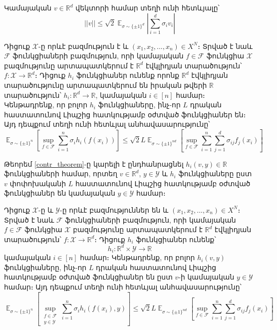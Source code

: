 \documentclass[12pt]{article}
\DeclareMathOperator*{\E}{\mathbb{E}}
\begin{document}
\begin{preposition}
\label{prep_vec_ineq}
Կամայական $v \in \mathbb{R}^d$ վեկտորի համար տեղի ունի հետևյալը՝
$$||v|| \leq \sqrt{2}\E_{\sigma \sim \{\pm1\}^d} \left| \sum_{i=1}^d \sigma_iv_i \right|$$
\end{preposition}
\begin{theorem}
\label{contr_theorem}
Դիցուք $\mathcal{X}$-ը որևէ բազմություն է և $(x_1, x_2, ..., x_n) \in X^N$։ Տրված է նաև $\mathcal{F}$ ֆունկցիաների բազմություն, որի կամայական $f \in \mathcal{F}$ ֆունկցիա $\mathcal{X}$ բազմությունը արտապատկերում է $\mathbb{R}^d$ էվկլիդյան տարածություն՝ $f:\mathcal{X} \rightarrow \mathbb{R}^d$։ Դիցուք $h_i$ ֆունկցիաներ ունենք որոնք $\mathbb{R}^d$ էվկլիդյան տարածությունը արտապատկերում են  իրական թվերի $\mathbb{R}$ տարածություն՝
$h_i:\mathbb{R}^d \rightarrow \mathbb{R}$, կամայական $i \in [n]$ համար։ Կենթադրենք, որ բոլոր $h_i$ ֆունկցիաները, ինչ-որ $L$ դրական հաստատունով Լիպշից հատկությամբ օժտված ֆունկցիաներ են։ Այդ դեպքում տեղի ունի հետևյալ անհավասարությունը՝
\begin{equation}
\label{contradiction_ineq}
\E_{\sigma \sim \{\pm 1\}^n}\left[\sup_{f \in \mathcal{F}}  \sum_{i=1}^n{\sigma_ih_i(f(x_i))}  \right]    \leq \sqrt{2}L \E_{\sigma \sim \{\pm1\}^{nd}} \left[  \sup_{f \in \mathcal{F}}  \sum_{i=1}^n\sum_{j=1}^d{\sigma_{ij}f_j(x_i)}   \right]
\end{equation}
\end{theorem}


\noindent
Թեորեմ \ref{contr_theorem}-ը կարելի է ընդհանրացնել  $h_i(v, y) \in \mathbb{R}$ ֆունկցիաների համար, որտեղ $v \in \mathbb{R}^d$, $y \in \mathcal{Y}$ և $h_i$ ֆունկցիաները ըստ $v$ փոփոխականի $L$ հաստատունով Լիպշից հատկությամբ օժտված ֆունկցիաներ են կամայական $y \in \mathcal{Y}$ համար։ 

\begin{theorem}
\label{contr_theorem}
Դիցուք $\mathcal{X}$-ը և $\mathcal{Y}$-ը որևէ բազմություններ են  և $(x_1, x_2, ..., x_n) \in X^N$։ Տրված է նաև $\mathcal{F}$ ֆունկցիաների բազմություն, որի կամայական $f \in \mathcal{F}$ ֆունկցիա $\mathcal{X}$ բազմությունը արտապատկերում է $\mathbb{R}^d$ էվկլիդյան տարածություն՝ $f:\mathcal{X} \rightarrow \mathbb{R}^d$։ Դիցուք $h_i$ ֆունկցիաներ ունենք՝ $$h_i:\mathbb{R}^d \times \mathcal{Y} \rightarrow \mathbb{R}$$ կամայական $i \in [n]$ համար։ Կենթադրենք, որ բոլոր $h_i(v, y)$ ֆունկցիաները, ինչ-որ $L$ դրական հաստատունով Լիպշից հատկությամբ օժտված ֆունկցիաներ են ըստ $v$-ի կամայական $y \in \mathcal{Y}$ համար։ Այդ դեպքում տեղի ունի հետևյալ անհավասարությունը՝
\begin{equation}
\label{contradiction_ineq}
\E_{\sigma \sim \{\pm 1\}^n}\left[\sup_{\substack{f \in \mathcal{F} \\ y \in \mathcal{Y}} }  \sum_{i=1}^n{\sigma_ih_i(f(x_i), y)}  \right]    \leq \sqrt{2}L \E_{\sigma \sim \{\pm1\}^{nd}} \left[  \sup_{f \in \mathcal{F}}  \sum_{i=1}^n\sum_{j=1}^d{\sigma_{ij}f_j(x_i)}   \right]
\end{equation}
\end{theorem}
\end{document}
